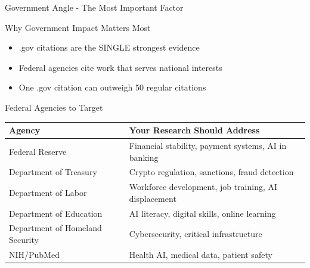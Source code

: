 \documentclass[11pt]{beamer}
\begin{document}
	\begin{frame}{Government Angle - The Most Important Factor}
		\scriptsize
		\begin{block}{Why Government Impact Matters Most}
			\begin{itemize}
				\item .gov citations are the SINGLE strongest evidence
				\item Federal agencies cite work that serves national interests
				\item One .gov citation can outweigh 50 regular citations
			\end{itemize}
		\end{block}
		\begin{block}{Federal Agencies to Target}
			\centering
			\begin{tabular}{|p{5cm}|p{5cm}|}
				\hline
				\textbf{Agency} & \textbf{Your Research Should Address} \\
				\hline
				Federal Reserve & Financial stability, payment systems, AI in banking \\
				\hline
				Department of Treasury & Crypto regulation, sanctions, fraud detection \\
				\hline
				Department of Labor & Workforce development, job training, AI displacement \\
				\hline
				Department of Education & AI literacy, digital skills, online learning \\
				\hline
				Department of Homeland Security & Cybersecurity, critical infrastructure \\
				\hline
				NIH/PubMed & Health AI, medical data, patient safety \\
				\hline
			\end{tabular}
		\end{block}
	\end{frame}
	
\end{document}
